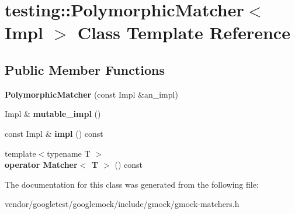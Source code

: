 \hypertarget{classtesting_1_1PolymorphicMatcher}{}\section{testing\+:\+:Polymorphic\+Matcher$<$ Impl $>$ Class Template Reference}
\label{classtesting_1_1PolymorphicMatcher}
\subsection*{Public Member Functions}
\begin{DoxyCompactItemize}
\item 
{\bfseries Polymorphic\+Matcher} (const Impl \&an\+\_\+impl)\hypertarget{classtesting_1_1PolymorphicMatcher_a04c23972b2dcc6e036b00006d7689712}{}\label{classtesting_1_1PolymorphicMatcher_a04c23972b2dcc6e036b00006d7689712}

\item 
Impl \& {\bfseries mutable\+\_\+impl} ()\hypertarget{classtesting_1_1PolymorphicMatcher_a3b7227b1f5c203efd47d393b781b317c}{}\label{classtesting_1_1PolymorphicMatcher_a3b7227b1f5c203efd47d393b781b317c}

\item 
const Impl \& {\bfseries impl} () const \hypertarget{classtesting_1_1PolymorphicMatcher_af667291ff018c21309b1222727fe4d1e}{}\label{classtesting_1_1PolymorphicMatcher_af667291ff018c21309b1222727fe4d1e}

\item 
{\footnotesize template$<$typename T $>$ }\\{\bfseries operator Matcher$<$ T $>$} () const \hypertarget{classtesting_1_1PolymorphicMatcher_a32d881a7f5cef1b25b447bbac199e042}{}\label{classtesting_1_1PolymorphicMatcher_a32d881a7f5cef1b25b447bbac199e042}

\end{DoxyCompactItemize}


The documentation for this class was generated from the following file\+:\begin{DoxyCompactItemize}
\item 
vendor/googletest/googlemock/include/gmock/gmock-\/matchers.\+h\end{DoxyCompactItemize}
